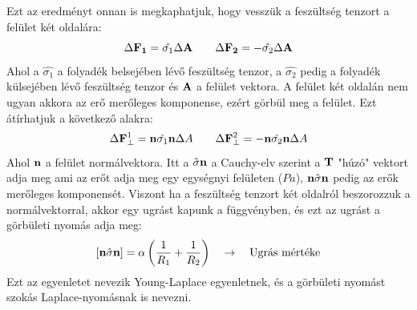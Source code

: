 \documentclass[../main.tex]{subfiles}
\begin{document}
Ezt az eredményt onnan is megkaphatjuk, hogy vesszük a feszültség tenzort a felület két oldalára:
\begin{equation}
    \Delta \bold{F_1} = \hat{\sigma_1} \Delta \bold{A} \quad \quad \Delta \bold{F_2} = - \hat{\sigma_2} \Delta \bold{A}
\end{equation}
Ahol a $\hat{\sigma_1}$ a folyadék belsejében lévő feszültség tenzor, a $\hat{\sigma_2}$ pedig a folyadék külsejében lévő feszültség tenzor és $\bold{A}$ a felület vektora.
A felület két oldalán nem ugyan akkora az erő merőleges komponense, ezért görbül meg a felület. Ezt átírhatjuk a következő alakra:
\begin{equation}
    \Delta \bold{F}_{\bot}^1 = \bold{n} \hat{\sigma_1} \bold{n} \Delta A \quad \quad \Delta \bold{F}_{\bot}^2 = -  \bold{n} \hat{\sigma_2} \bold{n} \Delta A
\end{equation}
Ahol $\bold{n}$ a felület normálvektora. Itt a $\hat{\sigma} \bold{n}$ a Cauchy-elv szerint a $\bold{T}$ "húzó" vektort adja meg ami az erőt adja meg egy egységnyi felületen ($Pa$),
 $\bold{n} \hat{\sigma} \bold{n}$ pedig az erők merőleges komponensét. Viszont ha a feszültség tenzort két oldalról beszorozzuk a normálvektorral,
akkor egy ugrást kapunk a függvényben, és ezt az ugrást a görbületi nyomás adja meg:
\begin{equation}
    \left[\bold{n} \hat{\sigma} \bold{n}\right] = \alpha \left(\frac{1}{R_1} + \frac{1}{R_2}\right) \quad \rightarrow \quad \text{Ugrás mértéke}
\end{equation}
Ezt az egyenletet nevezik Young-Laplace egyenletnek, és a görbületi nyomást szokás Laplace-nyomásnak is nevezni.
\end{document}
